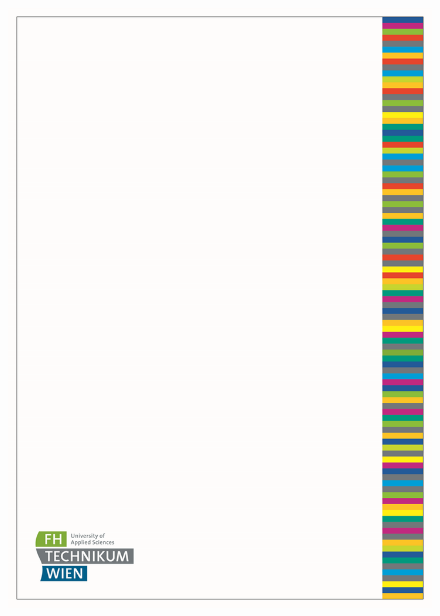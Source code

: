 \documentclass[a4paper]{article}
\begin{document}

    
    \begin{figure}[h!] %
		\includegraphics[width=\linewidth]{Image/Titelblatt.png}
	\end{figure}

    \newpage
    \tableofcontents
    \newpage

\end{document}
